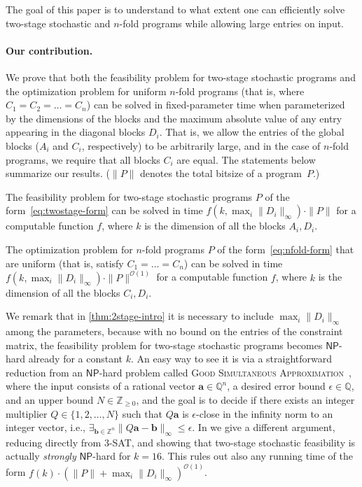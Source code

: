 \documentclass{theoretics}
\renewcommand{\leq}{\leqslant}
\renewcommand{\geq}{\geqslant}
\newcommand{\Z}{\mathbb{Z}}
\newcommand{\Zn}{\Z_{\geq 0}}
\newcommand{\Q}{\mathbb{Q}}
\newcommand{\tup}[1]{{\mathbf{#1}}}
\newcommand{\av}{\tup a}
\newcommand{\bb}{\tup b}
\newcommand{\Oh}{{\mathcal{O}}}
\begin{document}
The goal of this paper is to understand to what extent one can efficiently solve two-stage stochastic and $n$-fold programs
while allowing large entries on input.

\paragraph*{Our contribution.} We prove that both the feasibility problem for two-stage stochastic programs and the optimization problem for uniform $n$-fold programs (that is, where $C_1=C_2=\ldots=C_n$) can be solved in fixed-parameter time when parameterized by the dimensions of the blocks and the maximum absolute value of any entry appearing in the diagonal blocks $D_i$. That is, we allow the entries of the global blocks ($A_i$ and $C_i$, respectively) to be arbitrarily large, and in the case of $n$-fold programs, we require that all blocks $C_i$ are equal. The statements below summarize our results. ($\|P\|$ denotes the total bitsize of a program~$P$.)

\begin{theorem}\label{thm:2stage-intro}
   The feasibility problem for two-stage stochastic programs $P$ of the form~\cref{eq:twostage-form} can be solved in time $f(k,\max_i \|D_i\|_\infty)\cdot \|P\|$ for a computable function $f$, where $k$ is the dimension of all the blocks $A_i,D_i$.
\end{theorem}

\begin{theorem}\label{thm:nfold-intro}
    The optimization problem for $n$-fold programs $P$ of the form~\cref{eq:nfold-form} that are uniform (that is, satisfy $C_1=\ldots=C_n$) can be solved in time $f(k,\max_i \|D_i\|_\infty)\cdot \|P\|^{\Oh(1)}$ for a computable function $f$, where $k$ is the dimension of all the blocks $C_i,D_i$.
\end{theorem}

We remark that in \cref{thm:2stage-intro} it is necessary to include $\max_i \|D_i\|_\infty$ among the parameters, because with no bound on the entries of the constraint matrix, the feasibility problem for two-stage stochastic programs becomes $\mathsf{NP}$-hard already for a constant $k$. An easy way to see it is via a straightforward reduction from an $\mathsf{NP}$-hard problem called \textsc{Good Simultaneous Approximation}~\cite{Lagarias85}, where the input consists of a rational vector $\av \in \Q^n$, a desired error bound $\epsilon \in \Q$, and an upper bound $N \in \Zn$, and the goal is to decide if there exists an integer multiplier $Q \in \{1, 2, \ldots, N\}$ such that $Q\av$ is $\epsilon$-close in the infinity norm to an integer vector, i.e., $\exists_{\bb \in \Z^n} \|Q\av - \bb\|_\infty \leq \epsilon$. In  we give a different argument, reducing directly from 3-SAT, and showing that two-stage stochastic feasibility is actually \emph{strongly} $\mathsf{NP}$-hard for $k=16$. This rules out also any running time of the form $f(k) \cdot (\|P\|+\max_i \|D_i\|_\infty)^{\Oh(1)}$.
\end{document}
